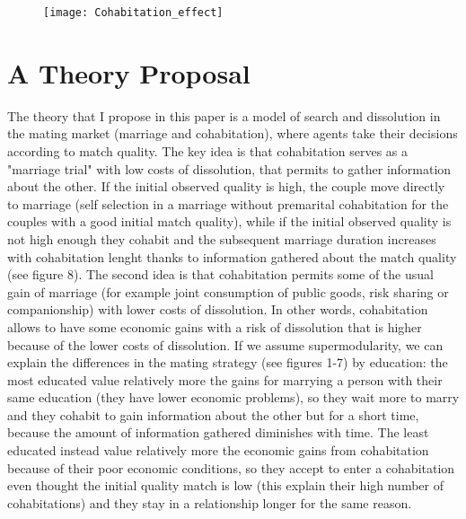 \documentclass[12pt]{article}
\begin{document}
\begin{itemize}
\begin{figure}[H]
\centering
\texttt{[image: Cohabitation\_effect]}
\caption{}
\label{fig:cohabitationeffect}
\end{figure}

\end{itemize}
\clearpage
\section{A Theory Proposal}
The theory that I propose in this paper is a model of search and dissolution in the mating market (marriage and cohabitation), where agents take their decisions according to match quality. The key idea is that cohabitation serves as a "marriage trial" with low costs of dissolution, that permits to gather information about the other. If the initial observed quality is high, the couple move directly to marriage (self selection in a marriage without premarital cohabitation for the couples with a good initial match quality), while if the initial observed quality is not high enough they cohabit and the subsequent marriage duration increases with cohabitation lenght thanks to information gathered about the match quality (see figure 8). The second idea is that cohabitation permits some of the usual gain of marriage (for example joint consumption of public goods, risk sharing or companionship) with lower costs of dissolution. In other words, cohabitation allows to have some economic gains with a risk of dissolution that is higher because of the lower costs of dissolution. If we assume supermodularity, we can explain the differences in the mating strategy (see figures 1-7) by education: the most educated value relatively more the gains for marrying a person with their same education (they have lower economic problems), so they wait more to marry and they cohabit to gain information about the other but for a short time, because the amount of information gathered diminishes with time. The least educated instead value relatively more the economic gains from cohabitation because of their poor economic conditions, so they accept to enter a cohabitation even thought the initial quality match is low (this explain their high number of cohabitations) and they stay in a relationship longer for the same reason.
\end{document}
